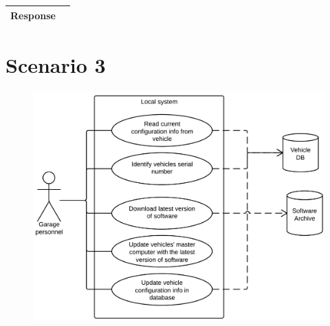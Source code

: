 \begin{table}[H]
\begin{tabular}{ p{4cm} | p{10cm} }
			\\ \hline
			{\bf Response} &  \\ \hline
		\end{tabular}
	\end{table}

\clearpage

\section{Scenario 3}
	
	\begin{figure}[H]
		\includegraphics[width=\textwidth]{pics/usecase3.png}
	\end{figure}

